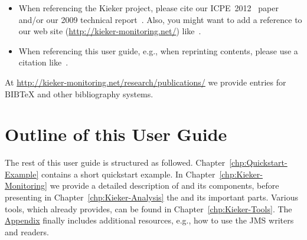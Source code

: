 		\begin{itemize}
			\item 
			When referencing the Kieker project, please cite our ICPE~2012~\cite{KiekerICPE2012} paper and/or our 2009 technical report~\cite{vanHoornRohrHasselbringWallerEhlersFreyKieselhorst2009TRContinuousMonitoringOfSoftwareServicesDesignAndApplicationOfTheKiekerFramework}. Also, you might want to add a reference to our web site (\url{http://kieker-monitoring.net/}) like~\cite{KiekerWebSite}. 
			\item 
			When referencing this user guide, e.g., when reprinting contents, please use a citation like~\cite{Kieker1.7UserGuide}.
		\end{itemize}

		\noindent At \url{http://kieker-monitoring.net/research/publications/} we provide entries for $\mathrm{B\scriptstyle IB}\!$\TeX{} and other bibliography systems.
		
	\section{Outline of this User Guide}
		The rest of this user guide is structured as followed. Chapter~\ref{chp:Quickstart-Example} contains a short quickstart example. In Chapter~\ref{chp:Kieker-Monitoring} we provide a detailed description of \KiekerMonitoringPart{} and its components, before presenting in Chapter~\ref{chp:Kieker-Analysis} the \KiekerAnalysisPart{} and its important parts. Various tools, which \Kieker{} already provides, can be found in Chapter~\ref{chp:Kieker-Tools}. The \hyperlink{hypertarget:appendix}{Appendix} finally includes additional resources, e.g., how to use the JMS writers and readers.